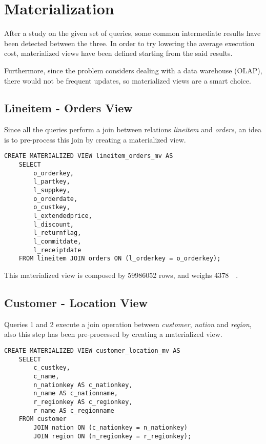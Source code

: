 

\section{Materialization}
\label{section:materialization}

After a study on the given set of queries, some common intermediate results have been detected between the three. In order to try lowering the average execution cost, materialized views have been defined starting from the said results.

Furthermore, since the problem considers dealing with a data warehouse (OLAP), there would not be frequent updates, so materialized views are a smart choice.

\subsection{Lineitem - Orders View}
Since all the queries perform a join between relations \textit{lineitem} and \textit{orders}, an idea is to pre-process this join by creating a materialized view.

\begin{lstlisting}
CREATE MATERIALIZED VIEW lineitem_orders_mv AS
	SELECT 
		o_orderkey, 
		l_partkey, 
		l_suppkey, 
		o_orderdate, 
		o_custkey, 
		l_extendedprice, 
		l_discount, 
		l_returnflag,
		l_commitdate,
		l_receiptdate
	FROM lineitem JOIN orders ON (l_orderkey = o_orderkey);
\end{lstlisting}

This materialized view is composed by \num{59986052} rows, and weighs \SI{4378}{\mega\byte}.

\subsection{Customer - Location View}
Queries 1 and 2 execute a join operation between \textit{customer}, \textit{nation} and \textit{region}, also this step has been pre-processed by creating a materialized view.

\begin{lstlisting}
CREATE MATERIALIZED VIEW customer_location_mv AS
	SELECT 
		c_custkey, 
		c_name, 
		n_nationkey AS c_nationkey, 
		n_name AS c_nationname, 
		r_regionkey AS c_regionkey, 
		r_name AS c_regionname 
	FROM customer 
		JOIN nation ON (c_nationkey = n_nationkey)
		JOIN region ON (n_regionkey = r_regionkey);
\end{lstlisting}

